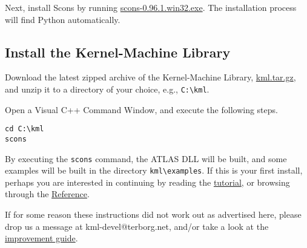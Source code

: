 \documentclass{article}
\begin{document}
Next, install Scons by running 
\href{http://prdownloads.sourceforge.net/scons/scons-0.96.1.win32.exe?download}{scons-0.96.1.win32.exe}. 
The installation process will find
Python automatically.

\subsection{Install the Kernel-Machine Library}
Download the latest zipped archive of the Kernel-Machine Library, 
\href{http://www.terborg.net/cgi-bin/viewcvs.cgi/trunk/kml.tar.gz?view=tar}{kml.tar.gz}, 
and unzip it to a directory of your choice, e.g., \texttt{C:\textbackslash kml}.

Open a Visual C++ Command Window, and execute the following steps.
%
\begin{verbatim}
cd C:\kml
scons
\end{verbatim}
%
By executing the \texttt{scons} command, the ATLAS DLL will be built, 
and some examples will be built in the directory \texttt{kml\textbackslash examples}.
If this is your first install, perhaps you are interested in continuing 
by reading the \href{\kmlroot/tutorial.html}{tutorial}, or browsing through 
the \href{\kmlroot/reference/}{Reference}.

If for some reason these instructions did not work out as advertised here,
please drop us a message at kml-devel@terborg.net, and/or take a look
at the \href{\kmlroot/improve.html}{improvement guide}.

% 



\end{document}
